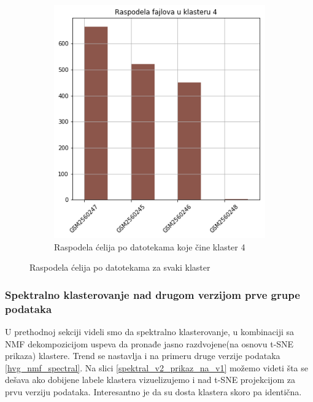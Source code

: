 \documentclass[a4paper]{article}
\begin{document}
\begin{figure}[H]
\begin{subfigure}[normla]{0.3\textwidth}
		\label{bar_spektral_cosine_klaster3}
	\end{subfigure}
	~
	\begin{subfigure}[normla]{0.3\textwidth}
		\includegraphics[scale=0.3]{bar_spektral_cosine_klaster4}
		\caption{Raspodela ćelija po datotekama koje čine klaster 4}
		\label{bar_spektral_cosine_klaster4}
	\end{subfigure}	
	\caption{Raspodela ćelija po datotekama za svaki klaster}
	
\label{raspodela_celija}
\end{figure}



\subsubsection{Spektralno klasterovanje nad drugom verzijom prve grupe podataka}

U prethodnoj sekciji videli smo da spektralno klasterovanje, u kombinaciji sa NMF dekompozicijom uspeva da pronađe jasno razdvojene(na osnovu t-SNE prikaza) klastere. Trend se nastavlja i na primeru druge verzije podataka \ref{hvg_nmf_spectral}. Na slici \ref{spektral_v2_prikaz_na_v1} možemo videti šta se dešava ako dobijene labele klastera vizuelizujemo i nad t-SNE projekcijom za prvu verziju podataka. Interesantno je da su dosta klastera skoro pa identična.
\end{document}
